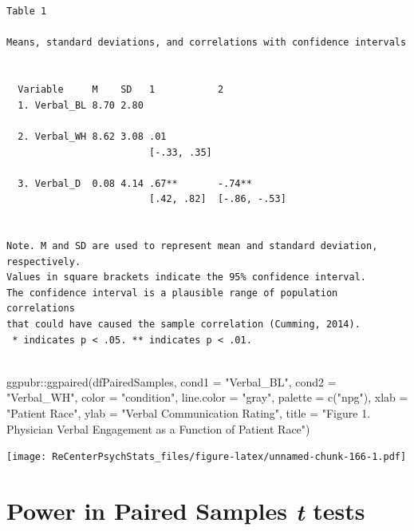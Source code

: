 \documentclass[
  11pt,
]{book}
\newenvironment{Shaded}{\begin{snugshade}}{\end{snugshade}}
\newcommand{\AttributeTok}[1]{\textcolor[rgb]{0.77,0.63,0.00}{#1}}
\newcommand{\FunctionTok}[1]{\textcolor[rgb]{0.00,0.00,0.00}{#1}}
\newcommand{\NormalTok}[1]{#1}
\newcommand{\SpecialCharTok}[1]{\textcolor[rgb]{0.00,0.00,0.00}{#1}}
\newcommand{\StringTok}[1]{\textcolor[rgb]{0.31,0.60,0.02}{#1}}
\begin{document}
\begin{verbatim}


Table 1 

Means, standard deviations, and correlations with confidence intervals
 

  Variable     M    SD   1           2           
  1. Verbal_BL 8.70 2.80                         
                                                 
  2. Verbal_WH 8.62 3.08 .01                     
                         [-.33, .35]             
                                                 
  3. Verbal_D  0.08 4.14 .67**       -.74**      
                         [.42, .82]  [-.86, -.53]
                                                 

Note. M and SD are used to represent mean and standard deviation, respectively.
Values in square brackets indicate the 95% confidence interval.
The confidence interval is a plausible range of population correlations 
that could have caused the sample correlation (Cumming, 2014).
 * indicates p < .05. ** indicates p < .01.
 
\end{verbatim}

\begin{Shaded}
\begin{Highlighting}[]
\NormalTok{ggpubr}\SpecialCharTok{::}\FunctionTok{ggpaired}\NormalTok{(dfPairedSamples, }\AttributeTok{cond1 =} \StringTok{"Verbal\_BL"}\NormalTok{, }\AttributeTok{cond2 =} \StringTok{"Verbal\_WH"}\NormalTok{,}
    \AttributeTok{color =} \StringTok{"condition"}\NormalTok{, }\AttributeTok{line.color =} \StringTok{"gray"}\NormalTok{, }\AttributeTok{palette =} \FunctionTok{c}\NormalTok{(}\StringTok{"npg"}\NormalTok{), }\AttributeTok{xlab =} \StringTok{"Patient Race"}\NormalTok{,}
    \AttributeTok{ylab =} \StringTok{"Verbal Communication Rating"}\NormalTok{, }\AttributeTok{title =} \StringTok{"Figure 1. Physician Verbal Engagement as a Function of Patient Race"}\NormalTok{)}
\end{Highlighting}
\end{Shaded}

\texttt{[image: ReCenterPsychStats\_files/figure-latex/unnamed-chunk-166-1.pdf]}

\hypertarget{power-in-paired-samples-t-tests}{%
\section{\texorpdfstring{Power in Paired Samples \emph{t} tests}{Power in Paired Samples t tests}}\label{power-in-paired-samples-t-tests}}
\end{document}
